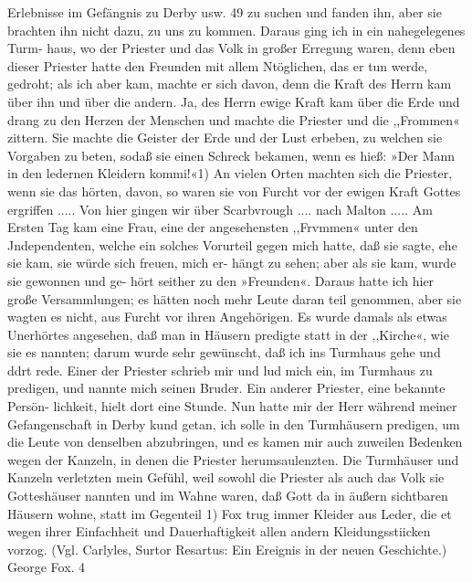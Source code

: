 Erlebnisse im Gefängnis zu Derby usw. 49
zu suchen und fanden ihn, aber sie brachten ihn nicht dazu, zu
uns zu kommen. Daraus ging ich in ein nahegelegenes Turm-
haus, wo der Priester und das Volk in großer Erregung waren,
denn eben dieser Priester hatte den Freunden mit allem Ntöglichen,
das er tun werde, gedroht; als ich aber kam, machte er sich davon,
denn die Kraft des Herrn kam über ihn und über die andern.
Ja, des Herrn ewige Kraft kam über die Erde und drang zu
den Herzen der Menschen und machte die Priester und die
,,Frommen« zittern. Sie machte die Geister der Erde und der
Lust erbeben, zu welchen sie Vorgaben zu beten, sodaß sie einen
Schreck bekamen, wenn es hieß: »Der Mann in den ledernen
Kleidern kommi!«1) An vielen Orten machten sich die Priester,
wenn sie das hörten, davon, so waren sie von Furcht vor der
ewigen Kraft Gottes ergriffen .....
Von hier gingen wir über Scarbvrough .... nach Malton .....
Am Ersten Tag kam eine Frau, eine der angesehensten ,,Frvmmen«
unter den Jndependenten, welche ein solches Vorurteil gegen mich
hatte, daß sie sagte, ehe sie kam, sie würde sich freuen, mich er-
hängt zu sehen; aber als sie kam, wurde sie gewonnen und ge-
hört seither zu den »Freunden«.
Daraus hatte ich hier große Versammlungen; es hätten noch
mehr Leute daran teil genommen, aber sie wagten es nicht, aus
Furcht vor ihren Angehörigen. Es wurde damals als etwas
Unerhörtes angesehen, daß man in Häusern predigte statt in der
,,Kirche«, wie sie es nannten; darum wurde sehr gewünscht, daß
ich ins Turmhaus gehe und ddrt rede. Einer der Priester schrieb
mir und lud mich ein, im Turmhaus zu predigen, und nannte
mich seinen Bruder. Ein anderer Priester, eine bekannte Persön-
lichkeit, hielt dort eine Stunde. Nun hatte mir der Herr während
meiner Gefangenschaft in Derby kund getan, ich solle in den
Turmhäusern predigen, um die Leute von denselben abzubringen,
und es kamen mir auch zuweilen Bedenken wegen der Kanzeln,
in denen die Priester herumsaulenzten. Die Turmhäuser und
Kanzeln verletzten mein Gefühl, weil sowohl die Priester als auch
das Volk sie Gotteshäuser nannten und im Wahne waren, daß
Gott da in äußern sichtbaren Häusern wohne, statt im Gegenteil
1) Fox trug immer Kleider aus Leder, die et wegen ihrer Einfachheit und
Dauerhaftigkeit allen andern Kleidungsstiicken vorzog. (Vgl. Carlyles, Surtor
Resartus: Ein Ereignis in der neuen Geschichte.)
George Fox. 4

